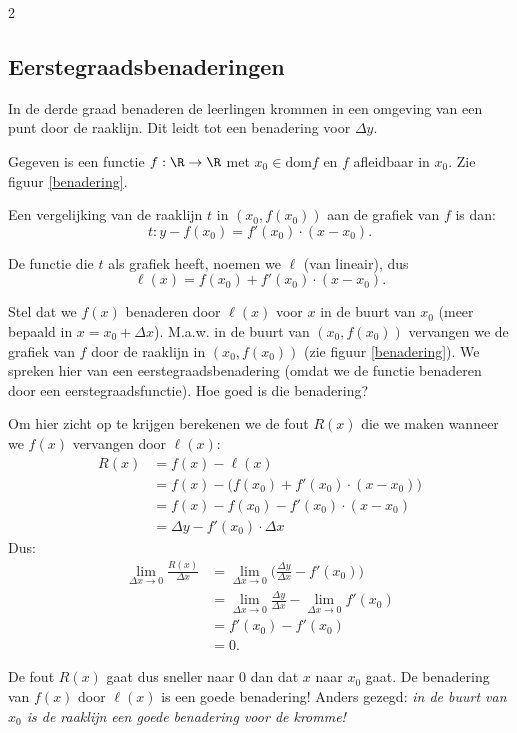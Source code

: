 \begin{multicols}{2} 

\subsection{Eerstegraadsbenaderingen}
In de derde graad benaderen de leerlingen krommen in een omgeving van een punt door de raaklijn. Dit leidt tot een benadering voor $\Delta y$.

Gegeven is een functie $f:\R\to \R$ met $x_0\in \text{dom}f$ en $f$ afleidbaar in $x_0$. Zie figuur \ref{benadering}.

Een vergelijking van de raaklijn $t$ in $(x_0,f(x_0))$ aan de grafiek van $f$ is dan:
$$t: y-f(x_0)=f'(x_0)\cdot (x-x_0).$$

De functie die $t$ als grafiek heeft, noemen we $\ell$ (van lineair), dus $$\ell(x)= f(x_0)+f'(x_0)\cdot (x-x_0).$$



Stel dat we $f(x)$ benaderen door $\ell(x)$ voor $x$ in de buurt van $x_0$ (meer bepaald in $x=x_0+\Delta x$). M.a.w. in de buurt van $(x_0,f(x_0))$ vervangen we de grafiek van $f$ door de raaklijn in $(x_0,f(x_0))$ (zie figuur \ref{benadering}). We spreken hier van een eerstegraadsbenadering (omdat we de functie benaderen door een eerstegraadsfunctie). Hoe goed is die benadering?

Om hier zicht op te krijgen berekenen we de fout $R(x)$ die we maken wanneer we $f(x)$ vervangen door $\ell(x)$:
\begin{align*}
R(x)&= f(x)-\ell(x)\\
	  &= f(x)-\Big(f(x_0)+f'(x_0)\cdot (x-x_0)\Big)\\
	  &= f(x)-f(x_0)-f'(x_0)\cdot (x-x_0)\\
	  &= \Delta y - f'(x_0)\cdot \Delta x
\end{align*}
Dus:
\begin{align*}
\lim_{\Delta x\to 0}\frac{R(x)}{\Delta x} &= \lim_{\Delta x\to 0}\Big(\frac{\Delta y}{\Delta x}-f'(x_0) \Big)\\
  &= \lim_{\Delta x\to 0}\frac{\Delta y}{\Delta x}- \lim_{\Delta x\to 0}f'(x_0)\\
  &= f'(x_0)-f'(x_0)\\
  &= 0.
\end{align*}

De fout $R(x)$ gaat dus sneller naar 0 dan dat $x$ naar $x_0$ gaat. De benadering van $f(x)$ door $\ell (x)$ is een goede benadering! Anders gezegd: \emph{in de buurt van $x_0$ is de raaklijn een goede benadering voor de kromme!}


\end{multicols}
